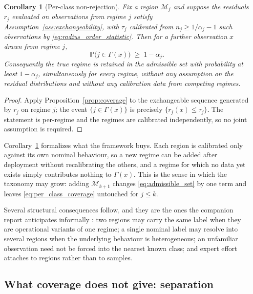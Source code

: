 \documentclass[a4paper]{cas-sc}
\newtheorem{corollary}{Corollary}
\newcommand{\residual}{\ensuremath{r}}
\newcommand{\Prob}{\ensuremath{\mathbb{P}}}
\begin{document}
\begin{corollary}[Per-class non-rejection]
\label{cor:per_class_coverage}
Fix a region \(\mathcal{M}_j\) and suppose the residuals
\(\residual_j\) evaluated on observations from regime \(j\) satisfy
Assumption~\ref{ass:exchangeability}, with \(\tau_j\) calibrated from
\(n_j\ge 1/\alpha_j-1\) such observations by
\eqref{eq:radius_order_statistic}. Then for a further observation \(x\) drawn
from regime \(j\),
\begin{equation}
\Prob\bigl(j\in\Gamma(x)\bigr)\;\ge\;1-\alpha_j .
\label{eq:per_class_coverage}
\end{equation}
Consequently the true regime is retained in the admissible set with
probability at least \(1-\alpha_j\), simultaneously for every regime, without
any assumption on the residual distributions and without any calibration data
from competing regimes.
\end{corollary}

\begin{proof}
Apply Proposition~\ref{prop:coverage} to the exchangeable sequence generated
by \(\residual_j\) on regime \(j\); the event \(\{j\in\Gamma(x)\}\) is
precisely \(\{\residual_j(x)\le\tau_j\}\). The statement is per-regime and the
regimes are calibrated independently, so no joint assumption is required.
\end{proof}

Corollary~\ref{cor:per_class_coverage} formalizes what the framework buys.
Each region is calibrated only against its own nominal behaviour, so a new
regime can be added after deployment without recalibrating the others, and a
regime for which no data yet exists simply contributes nothing to
\(\Gamma(x)\). This is the sense in which the taxonomy may grow: adding
\(\mathcal{M}_{k+1}\) changes \eqref{eq:admissible_set} by one term and leaves
\eqref{eq:per_class_coverage} untouched for \(j\le k\).

Several structural consequences follow, and they are the ones the companion
report anticipates informally \citep{disanti2026inverse}: two regions may
carry the same label when they are operational variants of one regime; a
single nominal label may resolve into several regions when the underlying
behaviour is heterogeneous; an unfamiliar observation need not be forced into
the nearest known class; and expert effort attaches to regions rather than to
samples.

\subsection{What coverage does not give: separation}
\label{subsec:coverage_not_separation}
\end{document}

